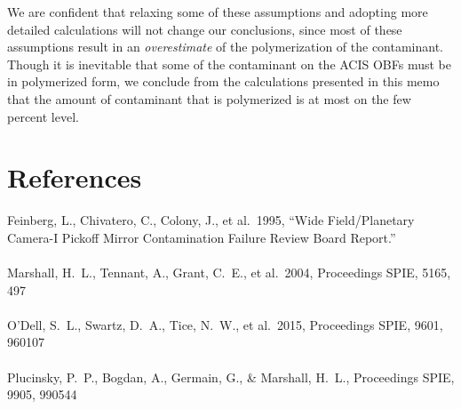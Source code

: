 \documentclass[11pt]{article}
\begin{document}
We are confident that relaxing some of these assumptions and adopting more detailed calculations will not change
our conclusions, since most of these assumptions result in an {\it overestimate} of the polymerization of the
contaminant. Though it is inevitable that some of the contaminant on the ACIS OBFs must be in polymerized form,
we conclude from the calculations presented in this memo that the amount of contaminant that is polymerized is at most
on the few percent level.

\section{References}

Feinberg, L., Chivatero, C., Colony, J., et al.\ 1995, ``Wide Field/Planetary Camera-I Pickoff Mirror Contamination Failure Review Board Report.''
\\
\\
\noindent
Marshall, H.~L., Tennant, A., Grant, C.~E., et al.\ 2004, Proceedings SPIE, 5165, 497
\\
\\
\noindent
O'Dell, S.~L., Swartz, D.~A., Tice, N.~W., et al.\ 2015, Proceedings SPIE, 9601, 960107
\\
\\
\noindent
Plucinsky, P.~P., Bogdan, A., Germain, G., \& Marshall, H.~L., Proceedings SPIE, 9905, 990544
\end{document}
